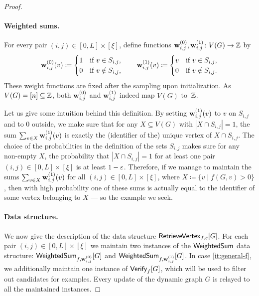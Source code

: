 \begin{proof}
\paragraph*{Weighted sums.}
For every pair $(i,j)\in [0,L]\times [\xi]$, define functions $\mathbf{w}^{(0)}_{i,j},\mathbf{w}^{(1)}_{i,j}\colon V(G)\to \mathbb{Z}$ by
\[
\mathbf{w}^{(0)}_{i,j}(v) \coloneqq
\begin{cases}
1 & \text{if } v\in S_{i,j},\\
0 & \text{if } v\notin S_{i,j},
\end{cases}
\qquad
\mathbf{w}^{(1)}_{i,j}(v) \coloneqq
\begin{cases}
v & \text{if } v\in S_{i,j},\\
0 & \text{if } v\notin S_{i,j}.
\end{cases}
\]
These weight functions are fixed after the sampling upon initialization.
As $V(G)=[n]\subseteq \mathbb{Z}$, both $\mathbf{w}^{(0)}_{i,j}$ and $\mathbf{w}^{(1)}_{i,j}$ indeed map $V(G)$ to~$\mathbb{Z}$.

Let us give some intuition behind this definition.
By setting $\mathbf{w}^{(1)}_{i,j}(v)$ to $v$ on $S_{i,j}$ and to $0$ outside, we make sure that for any $X\subseteq V(G)$ with $|X\cap S_{i,j}|=1$, the sum $\sum_{v\in X} \mathbf{w}^{(1)}_{i,j}(v)$ is exactly the (identifier of the) unique vertex of $X\cap S_{i,j}$. The choice of the probabilities in the definition of the sets $S_{i,j}$ makes sure for any non-empty $X$, the probability that $|X\cap S_{i,j}|=1$ for at least one pair $(i,j)\in [0,L]\times [\xi]$ is at least $1-\varepsilon$. Therefore, if we manage to maintain the sums $\sum_{v\in X} \mathbf{w}^{(1)}_{i,j}(v)$ for all $(i,j)\in [0,L]\times [\xi]$, where $X\coloneqq \{v\mid f(G,v)>0\}$, then with high probability one of these sums is actually equal to the identifier of some vertex belonging to $X$ --- so the example we seek.



\paragraph*{Data structure.}
We now give the description of the data structure $\mathsf{RetrieveVertex}_{f,\varepsilon}[G]$. For each pair $(i,j)\in [0,L]\times [\xi]$ we maintain two instances of the $\mathsf{WeightedSum}$ data structure: $\mathsf{WeightedSum}_{f,\mathbf{w}^{(0)}_{i,j}}[G]$ and $\mathsf{WeightedSum}_{f,\mathbf{w}^{(1)}_{i,j}}[G]$.
In case \ref{it:general-f}, we additionally maintain one instance of $\mathsf{Verify}_f[G]$, which will be used to filter out candidates for examples.
Every update of the dynamic graph $G$ is relayed to all the maintained instances.


\end{proof}
